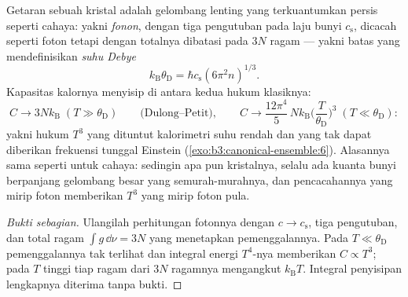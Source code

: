 \begin{theorem}\label{thm:b3:photons-phonons:debye}
Getaran sebuah kristal adalah gelombang lenting yang terkuantumkan
persis seperti cahaya: yakni \emph{fonon}, dengan tiga pengutuban pada
laju bunyi $c_{\text{s}}$, dicacah seperti foton tetapi dengan
totalnya dibatasi pada
$3N$ ragam --- yakni batas yang mendefinisikan \emph{suhu Debye}
\[
k_{\text{B}}\theta_{\text{D}} = \hbar c_{\text{s}}
(6\pi^2n)^{1/3} .
\]
Kapasitas kalornya menyisip di antara kedua hukum klasiknya:
\[
C \to 3Nk_{\text{B}} \;(T \gg \theta_{\text{D}})
\qquad\text{(Dulong--Petit)} ,
\qquad
C \to \frac{12\pi^4}{5}\,Nk_{\text{B}}
\Big(\frac{T}{\theta_{\text{D}}}\Big)^3
\;(T \ll \theta_{\text{D}}) :
\]
yakni hukum $T^3$ yang dituntut kalorimetri suhu rendah dan yang tak
dapat diberikan frekuensi tunggal Einstein
(\cref{exo:b3:canonical-ensemble:6}). Alasannya sama seperti
untuk cahaya: sedingin apa pun kristalnya, selalu ada kuanta bunyi
berpanjang gelombang besar yang semurah-murahnya, dan pencacahannya yang
mirip foton memberikan $T^3$ yang mirip foton pula.
\end{theorem}

\begin{proof}[Bukti sebagian]
Ulangilah perhitungan fotonnya dengan $c \to c_{\text{s}}$, tiga
pengutuban, dan total ragam $\int g\,\dd\nu = 3N$ yang menetapkan
pemenggalannya. Pada $T \ll \theta_{\text{D}}$ pemenggalannya tak
terlihat dan integral energi $T^4$-nya memberikan $C \propto T^3$; pada $T$
tinggi tiap ragam dari $3N$ ragamnya mengangkut $k_{\text{B}}T$. Integral
penyisipan lengkapnya diterima tanpa bukti.
\end{proof}

